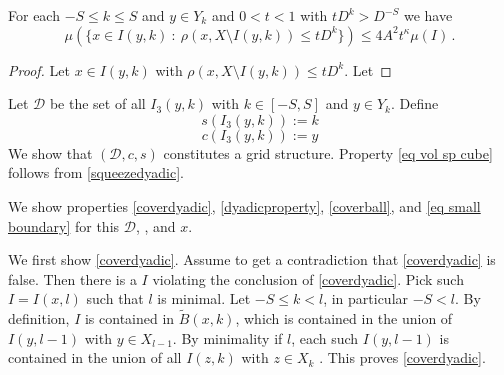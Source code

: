 \begin{lemma}
    For each $-S\le k\le S$ and $y\in Y_k$ and $0<t<1$
    with $tD^k>D^{-S}$ we have
    \begin{equation}
        \label{old small boundary}
        \mu(\{x \in I(y,k) \ : \ \rho(x, X \setminus I(y,k)) \leq t D^{k}\}) \le 4A^2 t^\kappa \mu(I)\,.
    \end{equation}
\end{lemma}
\begin{proof}
Let $x\in I(y,k)$ with  $\rho(x, X \setminus I(y,k)) \leq t D^{k}$. Let
\end{proof}

Let $\mathcal{D}$ be the set of all $I_3(y,k)$ with $k\in [-S,S]$ and
$y\in Y_k$. Define
\begin{equation}
s(I_3(y,k)):=k
\end{equation}
\begin{equation}
c(I_3(y,k)):=y
\end{equation}
We show that $(\mathcal{D},c,s)$ constitutes a grid structure. Property \eqref{eq vol sp cube}
follows from \eqref{squeezedyadic}.


 We show properties
\eqref{coverdyadic},
\eqref{dyadicproperty},
\eqref{coverball}, and \eqref{eq small boundary}
for this $\mathcal {D}$, , and $x$.

We first show \eqref{coverdyadic}.
Assume to get a contradiction that \eqref{coverdyadic}
is false. Then there is a $I$ violating the conclusion of
\eqref{coverdyadic}. Pick such $I=I(x,l)$  such that $l$ is minimal.
Let $-S\le k<l$, in particular $-S<l$. 
By definition, $I$ is contained in $\tilde{B}(x,k)$, which
is contained in the union of $I(y,l-1)$ with $y\in X_{l-1}$.
By minimality if $l$, each such $I(y,l-1)$  is contained in the union of
all $I(z,k)$ with $z\in X_k$ . This proves \eqref{coverdyadic}.

